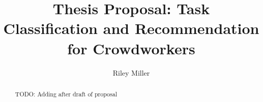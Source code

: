 \documentclass[letterpaper,12pt]{article}
\title{Thesis Proposal: Task Classification and Recommendation for Crowdworkers}
\author{Riley Miller}
\begin{document}


\frontmatter


\maketitle
\newpage


\makecopyright{\the\year}
\newpage


\makesubmittal
\newpage


\begin{abstract}

TODO: Adding after draft of proposal
\end{abstract}

\newpage


\tableofcontents
\newpage






\end{document}

